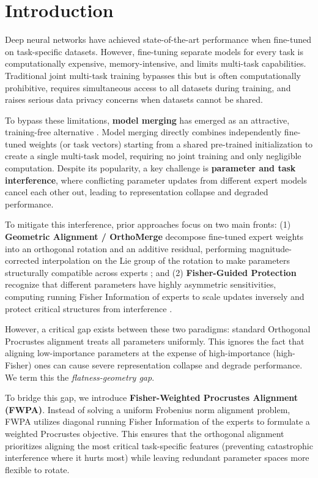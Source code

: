 \documentclass{article}
\theoremstyle{plain}
\theoremstyle{definition}
\theoremstyle{remark}
\begin{document}
\printAffiliationsAndNotice{}  %

\section{Introduction}
\label{sec:intro}
Deep neural networks have achieved state-of-the-art performance when fine-tuned on task-specific datasets. However, fine-tuning separate models for every task is computationally expensive, memory-intensive, and limits multi-task capabilities. Traditional joint multi-task training bypasses this but is often computationally prohibitive, requires simultaneous access to all datasets during training, and raises serious data privacy concerns when datasets cannot be shared. 

To bypass these limitations, \textbf{model merging} has emerged as an attractive, training-free alternative \cite{wortsman22, ilharco22, yadav23}. Model merging directly combines independently fine-tuned weights (or task vectors) starting from a shared pre-trained initialization to create a single multi-task model, requiring no joint training and only negligible computation. Despite its popularity, a key challenge is \textbf{parameter and task interference}, where conflicting parameter updates from different expert models cancel each other out, leading to representation collapse and degraded performance.

To mitigate this interference, prior approaches focus on two main fronts: (1) \textbf{Geometric Alignment / OrthoMerge} decompose fine-tuned expert weights into an orthogonal rotation and an additive residual, performing magnitude-corrected interpolation on the Lie group of the rotation to make parameters structurally compatible across experts \cite{orthomerge}; and (2) \textbf{Fisher-Guided Protection} recognize that different parameters have highly asymmetric sensitivities, computing running Fisher Information of experts to scale updates inversely and protect critical structures from interference \cite{sbf_symerge, sata_tta}.

However, a critical gap exists between these two paradigms: standard Orthogonal Procrustes alignment treats all parameters uniformly. This ignores the fact that aligning low-importance parameters at the expense of high-importance (high-Fisher) ones can cause severe representation collapse and degrade performance. We term this the \emph{flatness-geometry gap}.

To bridge this gap, we introduce \textbf{Fisher-Weighted Procrustes Alignment (FWPA)}. Instead of solving a uniform Frobenius norm alignment problem, FWPA utilizes diagonal running Fisher Information of the experts to formulate a weighted Procrustes objective. This ensures that the orthogonal alignment prioritizes aligning the most critical task-specific features (preventing catastrophic interference where it hurts most) while leaving redundant parameter spaces more flexible to rotate.
\end{document}
